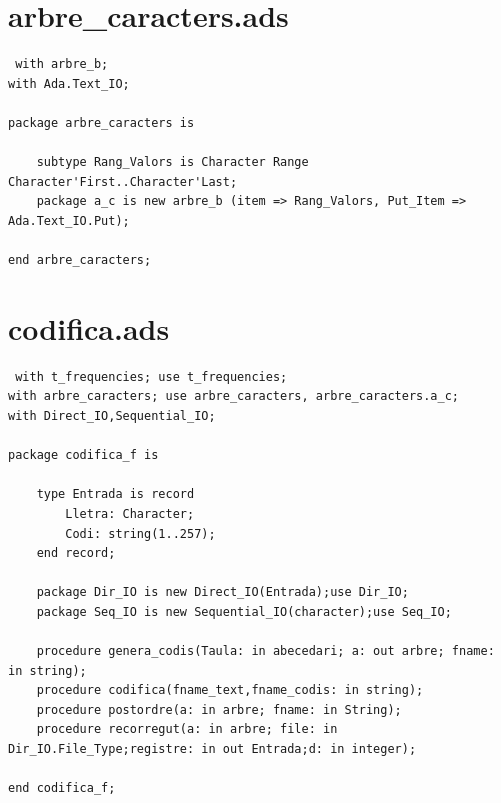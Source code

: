 \documentclass[a4paper,12pt]{article}
\begin{document}
\section{arbre\_caracters.ads}
\begin{lstlisting}
 with arbre_b;
with Ada.Text_IO;

package arbre_caracters is
	
	subtype Rang_Valors is Character Range Character'First..Character'Last;
	package a_c is new arbre_b (item => Rang_Valors, Put_Item => Ada.Text_IO.Put);

end arbre_caracters;

\end{lstlisting}
\pagebreak

\section{codifica.ads}
\begin{lstlisting}
 with t_frequencies; use t_frequencies;
with arbre_caracters; use arbre_caracters, arbre_caracters.a_c;
with Direct_IO,Sequential_IO;

package codifica_f is

	type Entrada is record
		Lletra: Character;
		Codi: string(1..257);
	end record;
	
	package Dir_IO is new Direct_IO(Entrada);use Dir_IO;
	package Seq_IO is new Sequential_IO(character);use Seq_IO;
	
	procedure genera_codis(Taula: in abecedari; a: out arbre; fname: in string);
	procedure codifica(fname_text,fname_codis: in string);	
	procedure postordre(a: in arbre; fname: in String);	
	procedure recorregut(a: in arbre; file: in Dir_IO.File_Type;registre: in out Entrada;d: in integer);

end codifica_f;

\end{lstlisting}
\end{document}
